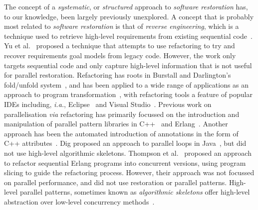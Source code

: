
The concept of a \emph{systematic}, or \emph{structured} approach to \emph{software restoration} has, to our knowledge, been largely previously unexplored. A concept that is probably most related to \emph{software restoration} is that of \emph{reverse engineering}, which is a technique used to retrieve high-level requirements from existing sequential code~\cite{10.1145/287000.287001}\cite{10.1145/337180.337234}. Yu et al.~\cite{10.1109/RE.2005.61} proposed a technique that attempts to use refactoring to try and recover requirements goal models from legacy code. However, the work only targets sequential code and only capture high-level information that is not useful for parallel restoration.
%
Refactoring has roots in Burstall and Darlington's fold/unfold system~\cite{darlington77}, and has been applied to a wide range of applications as an approach to program transformation~\cite{mens_refactoring}, with refactoring tools a feature of popular IDEs including, \textit{i.a.}, Eclipse~\cite{EclipseWeb} and Visual Studio~\cite{VisualStudioWeb}.
Previous work on parallelisation \textit{via} refactoring has primarily focussed on the introduction and manipulation of parallel pattern libraries in C++~\cite{brownagricultural,DBLP:conf/pdp/JanjicBMHDAG16} and Erlang~\cite{hlpp,DBLP:journals/cai/BarwellBHTB16}. Another approach
has been the automated introduction of annotations in the form of
C++ attributes~\cite{rio:2018}. Dig proposed an approach to parallel loops in Java~\cite{dig}, but did not use high-level algorithmic skeletons. Thompson et al.~\cite{10.1145/2678015.2682533} proposed an approach to refactor sequential Erlang programs into concurrent versions, using program slicing to guide the refactoring process. However, their approach was not focussed on parallel performance, and did not use restoration or parallel patterns.  
%
High-level parallel patterns, sometimes known as \emph{algorithmic skeletons} offer high-level abstraction over low-level concurrency methods~\cite{Asanovic:2009:VPC,DBLP:journals/spe/Gonzalez-VelezL10}.

